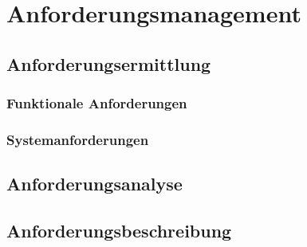 \chapter{Anforderungsmanagement}
\section{Anforderungsermittlung}
\subsection{Funktionale Anforderungen}
\subsection{Systemanforderungen}
\section{Anforderungsanalyse}
\section{Anforderungsbeschreibung}



